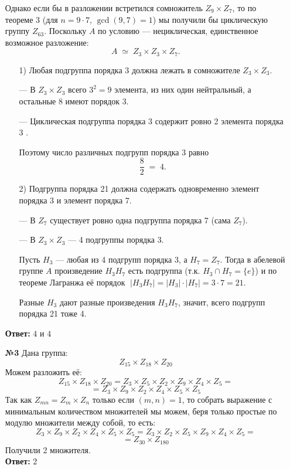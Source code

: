 \documentclass[a4paper]{article}
\begin{document}
\begin{enumerate}
    Однако если бы в разложении встретился сомножитель \(Z_{9}\times Z_7\), то по теореме 3 (для \(n=9\cdot7\), \(\gcd(9,7)=1\))  
    мы получили бы циклическую группу \(Z_{63}\).
    Поскольку \(A\) по условию — нециклическая, единственное возможное разложение:  
    \[
      A\;\simeq\;Z_{3}\times Z_{3}\times Z_{7}.
    \]
    \begin{enumerate}
        \item[1)]
        Любая подгруппа порядка 3 должна лежать в сомножителе \(Z_3\times Z_3\).  
        
        — В \(Z_3\times Z_3\) всего \(3^2=9\) элемента, из них один нейтральный, а остальные 8 имеют порядок 3.  
        
        — Циклическая подгруппа порядка 3 содержит ровно 2 элемента порядка 3 .  
        
        Поэтому число различных подгрупп порядка 3 равно  
        \[
        \frac{8}{2} \;=\;4.
        \]

        \item[2)]Подгруппа порядка 21 должна содержать одновременно элемент порядка 3 и элемент порядка 7.  
        
        — В \(Z_7\) существует ровно одна подгруппа порядка 7 (сама \(Z_7\)).  
        
        — В \(Z_3\times Z_3\) — 4 подгруппы порядка 3.  

        Пусть \(H_3\) — любая из 4 подгрупп порядка 3, а \(H_7=Z_7\). Тогда в абелевой группе \(A\) произведение \(H_3H_7\) есть подгруппа (т.к. \(H_3\cap H_7=\{e\}\)) и по теореме Лагранжа её порядок  
        \(\;|H_3H_7|=|H_3|\cdot|H_7|=3\cdot7=21\).  
        
        Разные \(H_3\) дают разные произведения \(H_3H_7\), значит, всего подгрупп порядка 21 тоже 4.

    \end{enumerate}
    \textbf{Ответ: } $4$ и $4$\\

    \item[\textbf{№3}]Дана группа:
    $$Z_{15} \times Z_{18} \times Z_{20}$$
    Можем разложить её:
    $$Z_{15} \times Z_{18} \times Z_{20} =
     Z_3 \times Z_5 \times Z_2 \times Z_9 \times Z_4 \times Z_5=$$
    $$=Z_3 \times Z_9  \times Z_2 \times Z_4 \times Z_5 \times Z_5$$
    Так как $Z_{mn} = Z_m \times Z_n$ только если $(m, n) = 1$, то собрать выражение с минимальным количеством множителей мы можем, беря только простые по модулю множители между собой, то есть:
    $$Z_3 \times Z_9  \times Z_2 \times Z_4 \times Z_5 \times Z_5 = Z_3\times Z_2 \times Z_5 \times Z_9  \times Z_4 \times Z_5 = $$
    $$ = Z_{30} \times Z_{180}$$
    Получили 2 множителя.\\
    \textbf{Ответ: } $2$\\


\end{enumerate}
\end{document}
